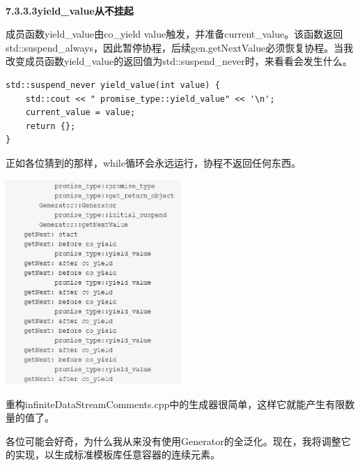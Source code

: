 \hspace*{\fill} \\ %
\noindent
\textbf{7.3.3.3\hspace{0.2cm}yield\_value从不挂起}

成员函数yield\_value由co\_yield value触发，并准备current\_value。该函数返回std::suspend\_always，因此暂停协程，后续gen.getNextValue必须恢复协程。当我改变成员函数yield\_value的返回值为std::suspend\_never时，来看看会发生什么。

\begin{lstlisting}[style=styleCXX]
std::suspend_never yield_value(int value) {
	std::cout << " promise_type::yield_value" << '\n';
	current_value = value;
	return {};
}
\end{lstlisting}

正如各位猜到的那样，while循环会永远运行，协程不返回任何东西。

\begin{center}
\includegraphics[width=0.5\textwidth]{content/3/chapter7/images/17.png}\\
\end{center}

重构infiniteDataStreamComments.cpp中的生成器很简单，这样它就能产生有限数量的值了。


各位可能会好奇，为什么我从来没有使用Generator的全泛化。现在，我将调整它的实现，以生成标准模板库任意容器的连续元素。

